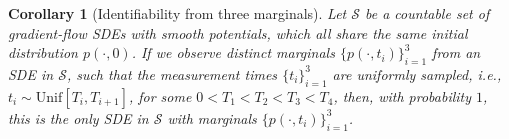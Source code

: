 \documentclass[twoside]{article}
\newtheorem{cor}[theorem]{Corollary}
\begin{document}
\begin{cor}[Identifiability from three marginals] 

Let $\mathcal{S}$ be a \emph{countable} set of gradient-flow SDEs with smooth potentials, which all share the same initial distribution $p(\cdot,0)$. If we observe distinct marginals $\{p(\cdot, t_i)\}_{i=1}^3$ 
from an SDE in $\mathcal{S}$, such that the measurement times $\{t_i\}_{i=1}^3$ are uniformly sampled, i.e., $t_i \sim \mathrm{Unif}[T_i, T_{i+1}]$, for some $0 < T_1<T_2<T_3<T_4$, then, with probability $1$, this is the only SDE in $\mathcal{S}$ with marginals $\{p(\cdot, t_i)\}_{i=1}^3$.











\label{cor:three_points}
\end{cor}
\end{document}
